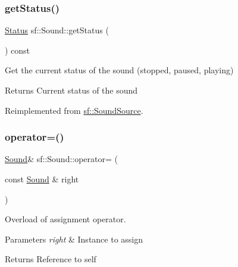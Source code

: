 \subsubsection{\texorpdfstring{getStatus()}{getStatus()}}
{\footnotesize\ttfamily \mbox{\hyperlink{classsf_1_1_sound_source_ac43af72c98c077500b239bc75b812f03}{Status}} sf\+::\+Sound\+::get\+Status (\begin{DoxyParamCaption}{ }\end{DoxyParamCaption}) const\hspace{0.3cm}{\ttfamily [virtual]}}



Get the current status of the sound (stopped, paused, playing) 

\begin{DoxyReturn}{Returns}
Current status of the sound \begin{DoxyVerb}\end{DoxyVerb}
 
\end{DoxyReturn}


Reimplemented from \mbox{\hyperlink{classsf_1_1_sound_source_aa8d313c31b968159582a999aa66e5ed7}{sf\+::\+Sound\+Source}}.

\mbox{\label{classsf_1_1_sound_a08c64c9c1dabeebc59fbf2540d81d4dd}} 
\subsubsection{\texorpdfstring{operator=()}{operator=()}}
{\footnotesize\ttfamily \mbox{\hyperlink{classsf_1_1_sound}{Sound}}\& sf\+::\+Sound\+::operator= (\begin{DoxyParamCaption}\item[{const \mbox{\hyperlink{classsf_1_1_sound}{Sound}} \&}]{right }\end{DoxyParamCaption})}



Overload of assignment operator. 


\begin{DoxyParams}{Parameters}
{\em right} & Instance to assign\\
\hline
\end{DoxyParams}
\begin{DoxyReturn}{Returns}
Reference to self \begin{DoxyVerb}\end{DoxyVerb}
 
\end{DoxyReturn}
\mbox{\label{classsf_1_1_sound_a5eeb25815bfa8cdc4a6cc000b7b19ad5}} 

